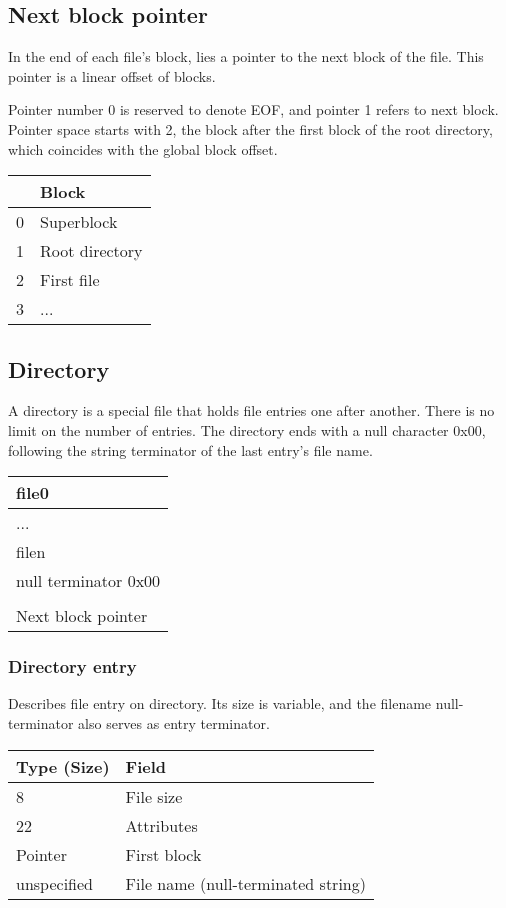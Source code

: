 \documentclass[]{article}
\begin{document}
	\subsection{Next block pointer}
	In the end of each file's block, lies a pointer to the next block of the file. This pointer is a linear offset of blocks.
	
	Pointer number 0 is reserved to denote EOF, and pointer 1 refers to next block. Pointer space starts with 2, the block after the first block of the root directory, which coincides with the global block offset.
	
	\begin{tabular}{|l|l|} 
		\hline
		 & \textbf{Block} \\ [0.5ex] 
		\hline
		0 & Superblock \\
		\hline
		1 & Root directory \\
		\hline
		2 & First file \\
		\hline
		3 & ... \\
		\hline
	\end{tabular}

	\subsection{Directory}
	
	A directory is a special file that holds file entries one after another. There is no limit on the number of entries. The directory ends with a null character 0x00, following the string terminator of the last entry's file name.
	
	\begin{tabular}{|l|} 
		\hline
		file0 \\ 
		\hline
		... \\
		\hline
		filen \\
		\hline
		null terminator 0x00 \\
		\hline
		[Padding] \\
		\hline
		Next block pointer \\
		\hline
	\end{tabular}

	\subsubsection{Directory entry}
	Describes file entry on directory. Its size is variable, and the filename null-terminator also serves as entry terminator.

	\begin{tabular}{|l|l|} 
		\hline
		\textbf{Type (Size)} & \textbf{Field} \\ [0.5ex] 
		\hline
		8 & File size \\
		\hline
		22 & Attributes \\
		\hline
		Pointer & First block \\
		\hline
		unspecified & File name (null-terminated string) \\
		\hline
	\end{tabular}
\end{document}

